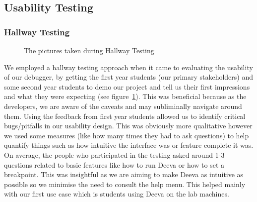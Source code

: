 \documentclass[11pt, a4paper]{article}
\begin{document}
\subsection{Usability Testing}

\subsubsection{Hallway Testing}
\begin{figure}[h!]
\centering
{}
\quad
{}
\caption{The pictures taken during Hallway Testing}
\label{fig:hallway}
\end{figure}

We employed a hallway testing approach when it came to evaluating the usability of our debugger, by getting the first year students (our primary stakeholders) and some second year students to demo our project and tell us their first impressions and what they were expecting (see figure~\ref{fig:hallway}). This was beneficial because as the developers, we are aware of the caveats and may subliminally navigate around them.
Using the feedback from first year students allowed us to identify critical bugs/pitfalls in our usability design.
This was obviously more qualitative however we used some measures (like how many times they had to ask questions) to help quantify things such as how intuitive the interface was or feature complete it was.
On average, the people who participated in the testing asked around 1-3 questions related to basic features like how to run Deeva or how to set a breakpoint.
This was insightful as we are aiming to make Deeva as intuitive as possible so we minimise the need to consult the help menu.
This helped mainly with our first use case which is students using Deeva on the lab machines.
\end{document}
